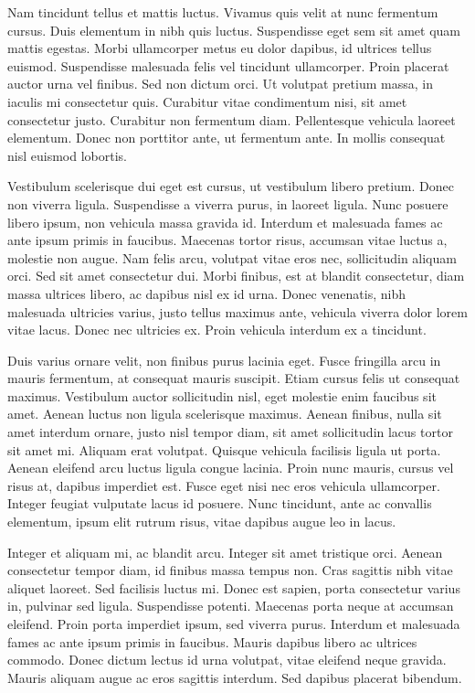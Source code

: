 \documentclass[
  12pt,
  a4paper,
  oneside]{book}
\begin{document}
Nam tincidunt tellus et mattis luctus. Vivamus quis velit at nunc fermentum cursus. Duis elementum in nibh quis luctus. Suspendisse eget sem sit amet quam mattis egestas. Morbi ullamcorper metus eu dolor dapibus, id ultrices tellus euismod. Suspendisse malesuada felis vel tincidunt ullamcorper. Proin placerat auctor urna vel finibus. Sed non dictum orci. Ut volutpat pretium massa, in iaculis mi consectetur quis. Curabitur vitae condimentum nisi, sit amet consectetur justo. Curabitur non fermentum diam. Pellentesque vehicula laoreet elementum. Donec non porttitor ante, ut fermentum ante. In mollis consequat nisl euismod lobortis.

Vestibulum scelerisque dui eget est cursus, ut vestibulum libero pretium. Donec non viverra ligula. Suspendisse a viverra purus, in laoreet ligula. Nunc posuere libero ipsum, non vehicula massa gravida id. Interdum et malesuada fames ac ante ipsum primis in faucibus. Maecenas tortor risus, accumsan vitae luctus a, molestie non augue. Nam felis arcu, volutpat vitae eros nec, sollicitudin aliquam orci. Sed sit amet consectetur dui. Morbi finibus, est at blandit consectetur, diam massa ultrices libero, ac dapibus nisl ex id urna. Donec venenatis, nibh malesuada ultricies varius, justo tellus maximus ante, vehicula viverra dolor lorem vitae lacus. Donec nec ultricies ex. Proin vehicula interdum ex a tincidunt.

Duis varius ornare velit, non finibus purus lacinia eget. Fusce fringilla arcu in mauris fermentum, at consequat mauris suscipit. Etiam cursus felis ut consequat maximus. Vestibulum auctor sollicitudin nisl, eget molestie enim faucibus sit amet. Aenean luctus non ligula scelerisque maximus. Aenean finibus, nulla sit amet interdum ornare, justo nisl tempor diam, sit amet sollicitudin lacus tortor sit amet mi. Aliquam erat volutpat. Quisque vehicula facilisis ligula ut porta. Aenean eleifend arcu luctus ligula congue lacinia. Proin nunc mauris, cursus vel risus at, dapibus imperdiet est. Fusce eget nisi nec eros vehicula ullamcorper. Integer feugiat vulputate lacus id posuere. Nunc tincidunt, ante ac convallis elementum, ipsum elit rutrum risus, vitae dapibus augue leo in lacus.

Integer et aliquam mi, ac blandit arcu. Integer sit amet tristique orci. Aenean consectetur tempor diam, id finibus massa tempus non. Cras sagittis nibh vitae aliquet laoreet. Sed facilisis luctus mi. Donec est sapien, porta consectetur varius in, pulvinar sed ligula. Suspendisse potenti. Maecenas porta neque at accumsan eleifend. Proin porta imperdiet ipsum, sed viverra purus. Interdum et malesuada fames ac ante ipsum primis in faucibus. Mauris dapibus libero ac ultrices commodo. Donec dictum lectus id urna volutpat, vitae eleifend neque gravida. Mauris aliquam augue ac eros sagittis interdum. Sed dapibus placerat bibendum.
\end{document}
